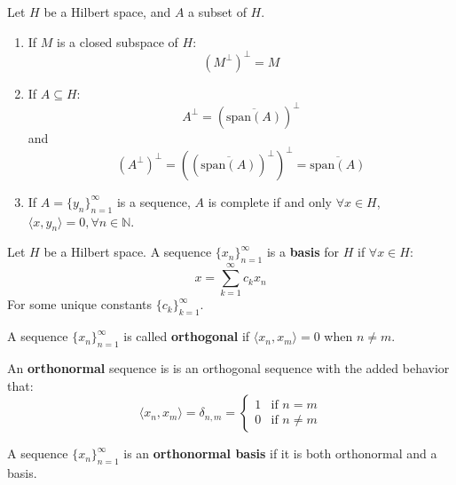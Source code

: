 \documentclass[12pt]{article}
\newenvironment{theorem}[2][Theorem]{\begin{trivlist}
\item[\hskip \labelsep {\bfseries #1}\hskip \labelsep {\bfseries #2.}]}{\end{trivlist}}
\newenvironment{definition}[2][Definition]{\begin{trivlist}
\item[\hskip \labelsep {\bfseries #1}\hskip \labelsep {\bfseries #2.}]}{\end{trivlist}}
\begin{document}
\begin{theorem}{(Spans and Orthogonal Complements)}
    Let $H$ be a Hilbert space, and $A$ a subset of $H$.
    \begin{enumerate}[label=(\alph*)]
        \item If $M$ is a closed subspace of $H$:
        $$(M^\perp)^\perp = M$$
        \item If $A \subseteq H$:
        $$A^\perp = (\overline{\text{span}(A)})^\perp$$ and 
        $$(A^\perp)^\perp = ((\overline{\text{span}(A)})^\perp)^\perp = \overline{\text{span}(A)}$$
        \item If $A = \{y_n\}_{n = 1}^\infty$ is a sequence, $A$ is complete if and only $\forall x \in H$, $\langle x, y_n \rangle = 0, \forall n \in \mathbb{N}$.
    \end{enumerate}
\end{theorem}

\begin{definition}{(Basis)}
    Let $H$ be a Hilbert space. A sequence $\{x_n\}_{n = 1}^\infty$ is a \textbf{basis} for $H$ if $\forall x \in H$:
    $$x = \sum_{k = 1}^\infty c_kx_n$$
    For some unique constants $\{c_k\}_{k = 1}^\infty$.
\end{definition}

\begin{definition}{(Orthogonal Sequence)}
    A sequence $\{x_n\}_{n = 1}^\infty$ is called \textbf{orthogonal} if $\langle x_n, x_m \rangle = 0$ when $n \neq m$.
\end{definition}

\begin{definition}{(Orthonormal Sequence)}
    An \textbf{orthonormal} sequence is is an orthogonal sequence with the added behavior that:
    \begin{equation}
        \langle x_n, x_m \rangle = \delta_{n,m} = \begin{cases}
            1 & \text{if } n = m \\
            0 & \text{if } n \neq m 
        \end{cases}
    \end{equation}
\end{definition}

\begin{definition}{(Orthonormal Basis)}
    A sequence $\{x_n\}_{n = 1}^\infty$ is an \textbf{orthonormal basis} if it is both orthonormal and a basis.
\end{definition}
\end{document}
